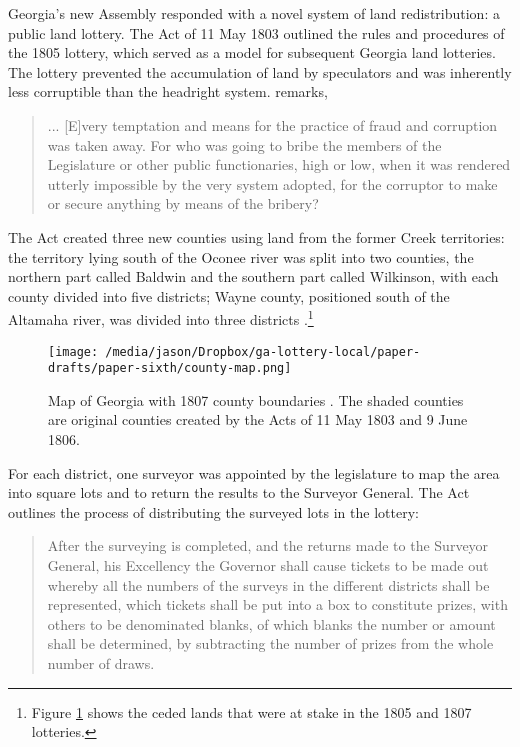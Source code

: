 Georgia's new Assembly responded with a novel system of land redistribution: a public land lottery. The Act of 11 May 1803 outlined the rules and procedures of the 1805 lottery, which served as a model for subsequent Georgia land lotteries. The lottery prevented the accumulation of land by speculators and was inherently less corruptible than the headright system. \citet{chappell1874} remarks, 

\begin{quotation}
	... [E]very temptation and means for the practice of fraud and corruption was taken away. For who was going to bribe the members of the Legislature or other public functionaries, high or low, when it was rendered utterly impossible by the very system adopted, for the corruptor to make or secure anything by means of the bribery?
\end{quotation}

The Act created three new counties using land from the former Creek territories: the territory lying south of the Oconee river was split into two counties, the northern part called Baldwin and the southern part called Wilkinson, with each county divided into five districts; Wayne county, positioned south of the Altamaha river, was divided into three districts \citep{clayton1812}.\footnote{Figure \ref{map} shows the ceded lands that were at stake in the 1805 and 1807 lotteries.}

\begin{figure}[htbp] 
	\centering
	\texttt{[image: /media/jason/Dropbox/ga-lottery-local/paper-drafts/paper-sixth/county-map.png]} 
	\caption{Map of Georgia with 1807 county boundaries \citep{long1995}. The shaded counties are original counties created by the Acts of 11 May 1803 and 9 June 1806.\label{map}}
\end{figure}

For each district, one surveyor was appointed by the legislature to map the area into square lots and to return the results to the Surveyor General. The Act outlines the process of distributing the surveyed lots in the lottery:

\begin{quotation}
	After the surveying is completed, and the returns made to the Surveyor General, his Excellency the Governor shall cause tickets to be made out whereby all the numbers of the surveys in the different districts shall be represented, which tickets shall be put into a box to constitute prizes, with others to be denominated blanks, of which blanks the number or amount shall be determined, by subtracting the number of prizes from the whole number of draws.
\end{quotation} 

